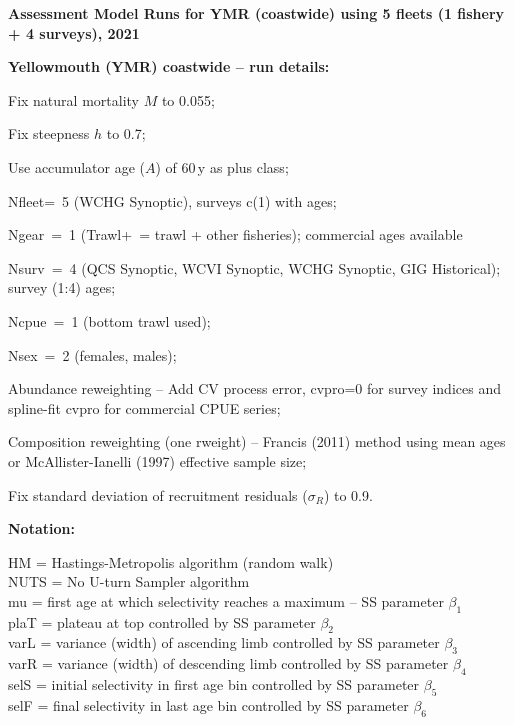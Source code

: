 
\textbf{Assessment Model Runs for YMR (coastwide) using 5 fleets (1 fishery + 4 surveys), 2021}


\textbf{Yellowmouth (YMR) coastwide -- run details:}
\begin{itemize_csas}
  \item Fix natural mortality $M$ to 0.055;
  \item Fix steepness $h$ to 0.7;
  \item Use accumulator age ($A$) of 60\,y as plus class;
  \item Nfleet=~5 (WCHG Synoptic), surveys c(1) with ages;
  \begin{itemize_csas}
    \item Ngear~=~1 (Trawl+~= trawl + other fisheries); commercial ages available
    \item Nsurv~=~4 (QCS Synoptic, WCVI Synoptic, WCHG Synoptic, GIG Historical); survey (1:4) ages;
  \end{itemize_csas}
  \item Ncpue~=~1 (bottom trawl used);
  \item Nsex~=~2 (females, males);
  \item Abundance reweighting -- Add CV process error, cvpro=0 for survey indices and spline-fit cvpro for commercial CPUE series;
  \item Composition reweighting (one rweight) -- Francis (2011) method using mean ages or McAllister-Ianelli (1997) effective sample size;
  \item Fix standard deviation of recruitment residuals ($\sigma_R$) to 0.9.
\end{itemize_csas}

\textbf{Notation:}

HM   = Hastings-Metropolis algorithm (random walk)\\
NUTS = No U-turn Sampler algorithm\\
mu   = first age at which selectivity reaches a maximum -- SS parameter $\beta_1$\\
plaT = plateau at top controlled by SS parameter $\beta_2$\\
varL = variance (width) of ascending limb controlled by SS parameter $\beta_3$\\
varR = variance (width) of descending limb controlled by SS parameter $\beta_4$\\
selS = initial selectivity in first age bin controlled by SS parameter $\beta_5$\\
selF = final selectivity in last age bin controlled by SS parameter $\beta_6$


